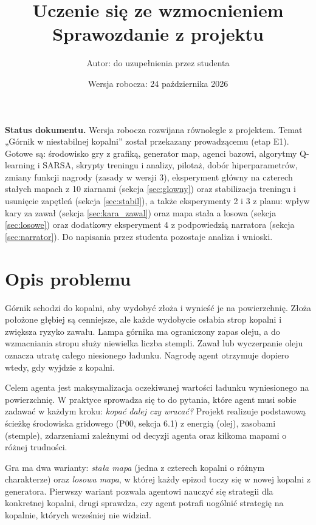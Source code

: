 \documentclass[11pt,a4paper]{article}
\title{Uczenie się ze wzmocnieniem\\Sprawozdanie z projektu}
\author{Autor: do uzupełnienia przez studenta}
\date{Wersja robocza: 24 października 2026}
\begin{document}
\maketitle
\textbf{Status dokumentu.} Wersja robocza rozwijana równolegle z projektem.
Temat „Górnik w niestabilnej kopalni” został przekazany prowadzącemu (etap E1).
Gotowe są: środowisko gry z grafiką, generator map, agenci bazowi, algorytmy
Q-learning i SARSA, skrypty treningu i analizy, pilotaż, dobór hiperparametrów,
zmiany funkcji nagrody (zasady w wersji 3), eksperyment główny na czterech
stałych mapach z 10 ziarnami (sekcja \ref{sec:glowny}) oraz stabilizacja treningu
i usunięcie zapętleń (sekcja \ref{sec:stabil}), a także eksperymenty 2 i 3 z planu:
wpływ kary za zawał (sekcja \ref{sec:kara_zawal}) oraz mapa stała a losowa (sekcja
\ref{sec:losowe}) oraz dodatkowy eksperyment 4 z podpowiedzią narratora (sekcja
\ref{sec:narrator}). Do napisania przez studenta pozostaje analiza i wnioski.
\tableofcontents

\section{Opis problemu}
Górnik schodzi do kopalni, aby wydobyć złoża i wynieść je na powierzchnię.
Złoża położone głębiej są cenniejsze, ale każde wydobycie osłabia strop kopalni
i zwiększa ryzyko zawału. Lampa górnika ma ograniczony zapas oleju, a do
wzmacniania stropu służy niewielka liczba stempli. Zawał lub wyczerpanie oleju
oznacza utratę całego niesionego ładunku. Nagrodę agent otrzymuje dopiero wtedy,
gdy wyjdzie z kopalni.

Celem agenta jest maksymalizacja oczekiwanej wartości ładunku wyniesionego na
powierzchnię. W praktyce sprowadza się to do pytania, które agent musi sobie
zadawać w każdym kroku: \emph{kopać dalej czy wracać?} Projekt realizuje
podstawową ścieżkę środowiska gridowego (P00, sekcja 6.1) z energią (olej),
zasobami (stemple), zdarzeniami zależnymi od decyzji agenta oraz kilkoma mapami
o różnej trudności.

Gra ma dwa warianty: \emph{stała mapa} (jedna z czterech kopalni o różnym
charakterze) oraz \emph{losowa mapa}, w której każdy epizod toczy się w nowej
kopalni z generatora. Pierwszy wariant pozwala agentowi nauczyć się strategii dla
konkretnej kopalni, drugi sprawdza, czy agent potrafi uogólnić strategię na
kopalnie, których wcześniej nie widział.
\end{document}

